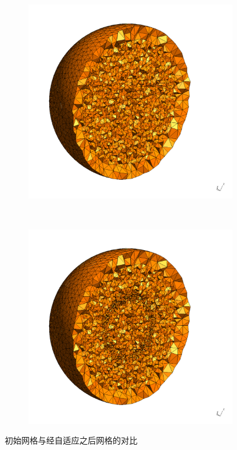 \begin{figure}[htbp]
  \centering
  \begin{subfigure}[b]{0.4\textwidth}
    \centering
    \includegraphics[scale=0.20]{./Pho/Chp4/3d_explosion_coarse_mesh.pdf}
  \end{subfigure}%
  ~
  \begin{subfigure}[b]{0.4\textwidth}
    \centering
    \includegraphics[scale=0.20]{./Pho/Chp4/3d_explosion_adaptive_first_step_mesh.pdf}
  \end{subfigure}
  \caption{初始网格与经自适应之后网格的对比}
  \label{fig:3d-explosion-adaptive-mesh-compare}
\end{figure}
